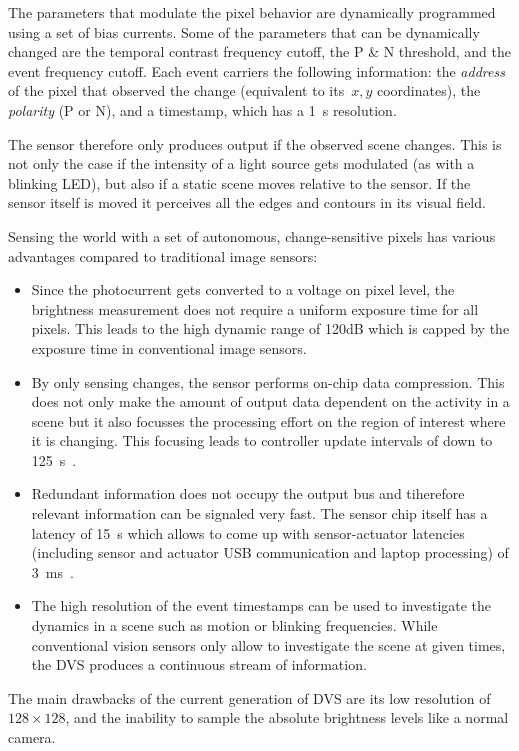 The parameters that modulate the pixel behavior are dynamically programmed
using a set of bias currents. Some of the parameters that can be dynamically
changed are the temporal contrast frequency cutoff, the P \& N threshold,
and the event frequency cutoff. Each event carriers the following
information: the \emph{address }of the pixel that observed the change
(equivalent to its~$x,y$ coordinates), the \emph{polarity} (P or
N), and a timestamp, which has a 1~\textmu{}s resolution.

The sensor therefore only produces output if the observed scene changes.
This is not only the case if the intensity of a light source gets
modulated (as with a blinking LED), but also if a static scene moves
relative to the sensor. If the sensor itself is moved it perceives
all the edges and contours in its visual field.

Sensing the world with a set of autonomous, change-sensitive pixels
has various advantages compared to traditional image sensors:
\begin{itemize}
\item Since the photocurrent gets converted to a voltage on pixel level,
the brightness measurement does not require a uniform exposure time
for all pixels. This leads to the high dynamic range of 120dB which
is capped by the exposure time in conventional image sensors.
\item By only sensing changes, the sensor performs on-chip data compression.
This does not only make the amount of output data dependent on the
activity in a scene but it also focusses the processing effort on
the region of interest where it is changing. This focusing leads to
controller update intervals of down to 125~\textmu{}s~\cite{conradt09pencil}.
\item Redundant information does not occupy the output bus and tiherefore
relevant information can be signaled very fast. The sensor chip itself
has a latency of 15~\textmu{}s which allows to come up with sensor-actuator
latencies (including sensor and actuator USB communication and laptop
processing) of 3~ms~\cite{delbruck07fast}.
\item The high resolution of the event timestamps can be used to investigate
the dynamics in a scene such as motion or blinking frequencies. While
conventional vision sensors only allow to investigate the scene at
given times, the DVS produces a continuous stream of information.
\end{itemize}
The main drawbacks of the current generation of DVS are its low resolution
of $128\times128$, and the inability to sample the absolute brightness
levels like a normal camera. 

